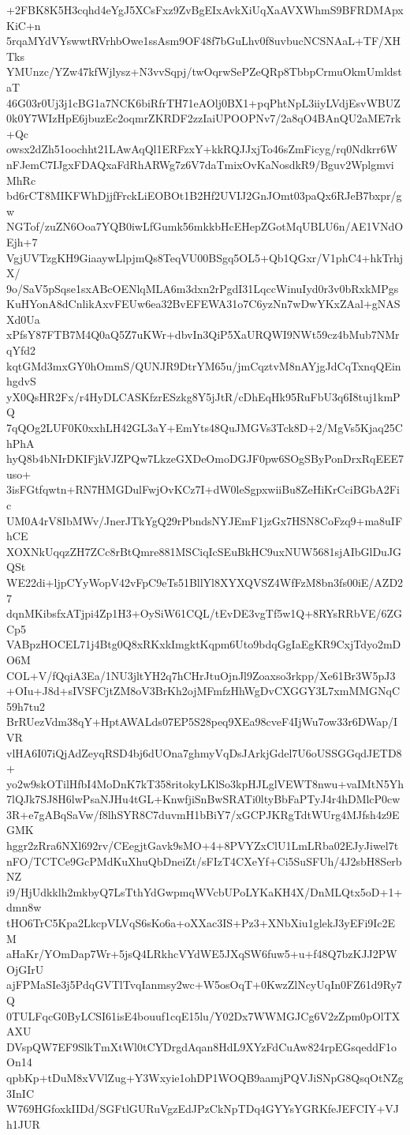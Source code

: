 +2FBK8K5H3cqhd4eYgJ5XCsFxz9ZvBgEIxAvkXiUqXaAVXWhmS9BFRDMApxKiC+n
5rqaMYdVYswwtRVrhbOwe1ssAsm9OF48f7bGuLhv0f8uvbucNCSNAaL+TF/XHTks
YMUnzc/YZw47kfWjlysz+N3vvSqpj/twOqrwSePZeQRp8TbbpCrmuOkmUmldstaT
46G03r0Uj3j1cBG1a7NCK6biRfrTH71eAOlj0BX1+pqPhtNpL3iiyLVdjEsvWBUZ
0k0Y7WIzHpE6jbuzEc2oqmrZKRDF2zzIaiUPOOPNv7/2a8qO4BAnQU2aME7rk+Qc
owsx2dZh51oochht21LAwAqQl1ERFzxY+kkRQJJxjTo46sZmFicyg/rq0Ndkrr6W
nFJemC7IJgxFDAQxaFdRhARWg7z6V7daTmixOvKaNosdkR9/Bguv2WplgmviMhRc
bd6rCT8MIKFWhDjjfFrckLiEOBOt1B2Hf2UVIJ2GnJOmt03paQx6RJeB7bxpr/gw
NGTof/zuZN6Ooa7YQB0iwLfGumk56mkkbHcEHepZGotMqUBLU6n/AE1VNdOEjh+7
VgjUVTzgKH9GiaaywLlpjmQs8TeqVU00BSgq5OL5+Qb1QGxr/V1phC4+hkTrhjX/
9o/SaV5pSqse1sxABcOENlqMLA6m3dxn2rPgdI31LqccWinuIyd0r3v0bRxkMPgs
KuHYonA8dCnlikAxvFEUw6ea32BvEFEWA31o7C6yzNn7wDwYKxZAal+gNASXd0Ua
xPfsY87FTB7M4Q0aQ5Z7uKWr+dbvIn3QiP5XaURQWI9NWt59cz4bMub7NMrqYfd2
kqtGMd3mxGY0hOmmS/QUNJR9DtrYM65u/jmCqztvM8nAYjgJdCqTxnqQEinhgdvS
yX0QsHR2Fx/r4HyDLCASKfzrESzkg8Y5jJtR/cDhEqHk95RuFbU3q6I8tuj1kmPQ
7qQOg2LUF0K0xxhLH42GL3aY+EmYts48QuJMGVs3Tck8D+2/MgVs5Kjaq25ChPhA
hyQ8b4bNIrDKIFjkVJZPQw7LkzeGXDeOmoDGJF0pw6SOgSByPonDrxRqEEE7uso+
3isFGtfqwtn+RN7HMGDulFwjOvKCz7I+dW0leSgpxwiiBu8ZeHiKrCciBGbA2Fic
UM0A4rV8IbMWv/JnerJTkYgQ29rPbndsNYJEmF1jzGx7HSN8CoFzq9+ma8uIFhCE
XOXNkUqqzZH7ZCc8rBtQmre881MSCiqIcSEuBkHC9uxNUW5681sjAIbGlDuJGQSt
WE22di+ljpCYyWopV42vFpC9eTs51BllYl8XYXQVSZ4WfFzM8bn3fs00iE/AZD27
dqnMKibsfxATjpi4Zp1H3+OySiW61CQL/tEvDE3vgTf5w1Q+8RYsRRbVE/6ZGCp5
VABpzHOCEL71j4Btg0Q8xRKxkImgktKqpm6Uto9bdqGgIaEgKR9CxjTdyo2mDO6M
COL+V/fQqiA3Ea/1NU3jltYH2q7hCHrJtuOjnJl9Zoaxso3rkpp/Xe61Br3W5pJ3
+OIu+J8d+sIVSFCjtZM8oV3BrKh2ojMFmfzHhWgDvCXGGY3L7xmMMGNqC59h7tu2
BrRUezVdm38qY+HptAWALds07EP5S28peq9XEa98cveF4IjWu7ow33r6DWap/IVR
vlHA6I07iQjAdZeyqRSD4bj6dUOna7ghmyVqDsJArkjGdel7U6oUSSGGqdJETD8+
yo2w9skOTilHfbI4MoDnK7kT358ritokyLKlSo3kpHJLglVEWT8nwu+vaIMtN5Yh
7lQJk7SJ8H6lwPsaNJHu4tGL+KnwfjiSnBwSRATi0ltyBbFaPTyJ4r4hDMlcP0cw
3R+e7gABqSaVw/f8lhSYR8C7duvmH1bBiY7/xGCPJKRgTdtWUrg4MJfsh4z9EGMK
hggr2zRra6NXl692rv/CEegjtGavk9sMO+4+8PVYZxClU1LmLRba02EJyJiwel7t
nFO/TCTCe9GcPMdKuXhuQbDneiZt/sFIzT4CXeYf+Ci5SuSFUh/4J2sbH8SerbNZ
i9/HjUdkklh2mkbyQ7LsTthYdGwpmqWVcbUPoLYKaKH4X/DnMLQtx5oD+1+dmn8w
tHO6TrC5Kpa2LkcpVLVqS6sKo6a+oXXac3IS+Pz3+XNbXiu1glekJ3yEFi9Ic2EM
aHaKr/YOmDap7Wr+5jsQ4LRkhcVYdWE5JXqSW6fuw5+u+f48Q7bzKJJ2PWOjGIrU
ajFPMaSIe3j5PdqGVTlTvqIanmsy2wc+W5osOqT+0KwzZlNcyUqIn0FZ61d9Ry7Q
0TULFqcG0ByLCSI61isE4bouuf1cqE15lu/Y02Dx7WWMGJCg6V2zZpm0pOlTXAXU
DVspQW7EF9SlkTmXtWl0tCYDrgdAqan8HdL9XYzFdCuAw824rpEGsqeddF1oOn14
qpbKp+tDuM8xVVlZug+Y3Wxyie1ohDP1WOQB9aamjPQVJiSNpG8QsqOtNZg3InIC
W769HGfoxkIIDd/SGFtlGURuVgzEdJPzCkNpTDq4GYYsYGRKfeJEFCIY+VJh1JUR
